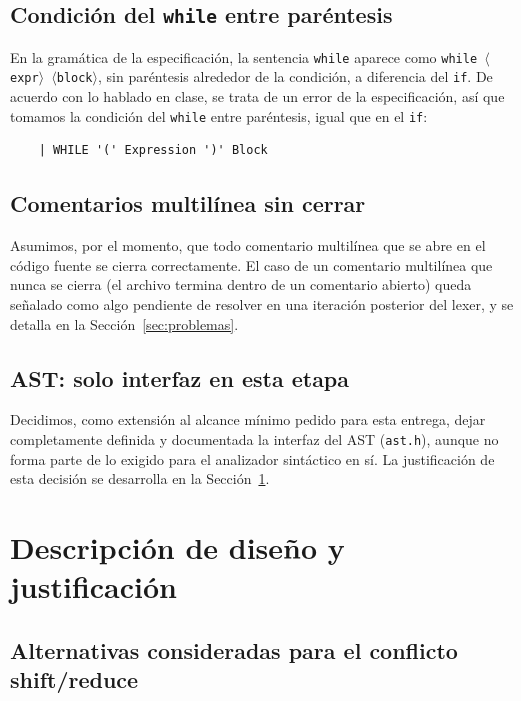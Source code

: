 \documentclass[11pt,a4paper]{article}
\begin{document}
\subsection{Condición del \texttt{while} entre paréntesis}

En la gramática de la especificación, la sentencia \texttt{while} aparece como
\texttt{while $\langle$expr$\rangle$ $\langle$block$\rangle$}, sin paréntesis
alrededor de la condición, a diferencia del \texttt{if}. De acuerdo con lo
hablado en clase, se trata de un error de la especificación, así que tomamos la
condición del \texttt{while} entre paréntesis, igual que en el \texttt{if}:

\begin{verbatim}
    | WHILE '(' Expression ')' Block
\end{verbatim}

\subsection{Comentarios multilínea sin cerrar}

Asumimos, por el momento, que todo comentario multilínea que se abre en el
código fuente se cierra correctamente. El caso de un comentario multilínea
que nunca se cierra (el archivo termina dentro de un comentario abierto)
queda señalado como algo pendiente de resolver en una iteración posterior del
lexer, y se detalla en la Sección~\ref{sec:problemas}.

\subsection{AST: solo interfaz en esta etapa}

Decidimos, como extensión al alcance mínimo pedido para esta entrega, dejar
completamente definida y documentada la interfaz del AST (\texttt{ast.h}),
aunque no forma parte de lo exigido para el analizador sintáctico en sí. La
justificación de esta decisión se desarrolla en la Sección~\ref{sec:ast}.

\section{Descripción de diseño y justificación}
\label{sec:ast}

\subsection{Alternativas consideradas para el conflicto shift/reduce}
\end{document}
